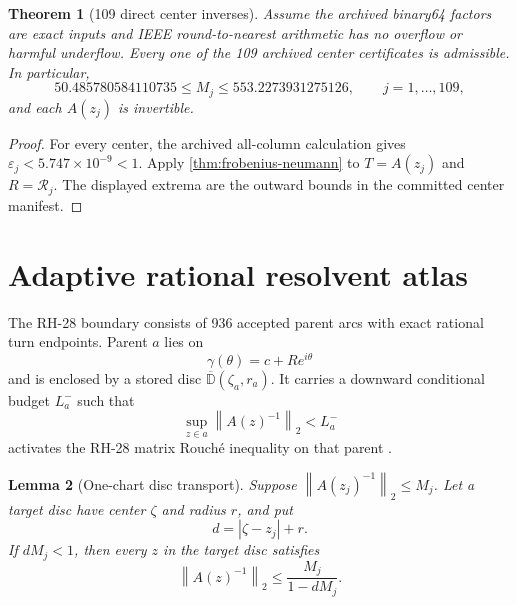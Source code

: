 \documentclass[11pt]{article}
\newtheorem{theorem}{Theorem}[section]
\newtheorem{lemma}[theorem]{Lemma}
\theoremstyle{definition}
\theoremstyle{remark}
\newcommand{\norm}[1]{\left\lVert#1\right\rVert}
\newcommand{\Rapp}{\mathcal R}
\begin{document}
\begin{theorem}[109 direct center inverses]
\label{thm:center-inverses}
Assume the archived binary64 factors are exact inputs and IEEE
round-to-nearest arithmetic has no overflow or harmful underflow.  Every one
of the 109 archived center certificates is admissible.  In particular,
\begin{equation}
 50.485780584110735\leq M_j\leq553.2273931275126,
 \qquad j=1,\ldots,109,
 \label{eq:center-range}
\end{equation}
and each $A(z_j)$ is invertible.
\end{theorem}

\begin{proof}
For every center, the archived all-column calculation gives
$\varepsilon_j<5.747\times10^{-9}<1$.  Apply
\cref{thm:frobenius-neumann} to $T=A(z_j)$ and $R=\Rapp_j$.  The displayed
extrema are the outward bounds in the committed center manifest.
\end{proof}

\section{Adaptive rational resolvent atlas}
\label{sec:atlas}

The RH-28 boundary consists of 936 accepted parent arcs with exact rational
turn endpoints.  Parent $a$ lies on
\begin{equation}
 \gamma(\theta)=c+Re^{i\theta}
 \label{eq:circle-parameterization}
\end{equation}
and is enclosed by a stored disc
$\overline{\mathbb D}(\zeta_a,r_a)$.  It carries a downward conditional
budget $L_a^-$ such that
\begin{equation}
 \sup_{z\in a}\norm{A(z)^{-1}}_2<L_a^-
 \label{eq:rh28-resolvent-gate}
\end{equation}
activates the RH-28 matrix Rouch\'e inequality on that parent
\citep{WangArcwise2026}.

\begin{lemma}[One-chart disc transport]
\label{lem:chart-transport}
Suppose $\norm{A(z_j)^{-1}}_2\leq M_j$.  Let a target disc have center
$\zeta$ and radius $r$, and put
\begin{equation}
 d=|\zeta-z_j|+r.
 \label{eq:chart-distance}
\end{equation}
If $dM_j<1$, then every $z$ in the target disc satisfies
\begin{equation}
 \norm{A(z)^{-1}}_2\leq\frac{M_j}{1-dM_j}.
 \label{eq:chart-transport}
\end{equation}
\end{lemma}
\end{document}
